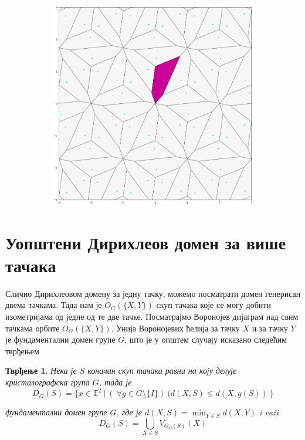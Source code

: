 \documentclass[12pt]{report}
\newtheorem{tvrdjenje}{\bf Тврђење}
\begin{document}
\begin{figure}[H]
\begin{subfigure}[b]{0.32\textwidth}
  \end{subfigure}
  \begin{subfigure}[b]{0.32\textwidth}
    \includegraphics[width=.9\textwidth]{dirihleov3.png}
    \label{fig:f3}
  \end{subfigure}
\end{figure}


    \section{Уопштени Дирихлеов домен за више тачака}\label{konstrukcija-dirihleove-fundamentalne-oblasti}
    
Слично Дирихлеовом домену за једну тачку,  можемо посматрати домен генерисан двема тачкама. Тада нам је  $O_G(\{X,Y\})$ скуп тачака које се могу добити изометријама од једне од те две тачке. Посматрајмо Воронојев дијаграм над свим тачкама орбите $O_G(\{X,Y\})$.  Унија Воронојевих ћелија за тачку $X$ и за тачку $Y$ је фундаментални домен групе $G$, што је у општем случају исказано следећим тврђењем
\begin{tvrdjenje}
Нека је $S$ коначан скуп тачака равни на коју делује кристалографска група $G$, тада је 
$$D_G(S) = \{x \in \mathbb{E}^2\:|\:(\:\forall g \in G \setminus \{I\})\:(d(X,S)\leq d(X,g(S))\:\}$$

фундаментални домен групе $G$, где је $d(X,S) = \min_{Y \in S} d(X,Y)$ i va\v zi 
$$D_G(S) = \bigcup_{X \in S} V_{O_G(S)}(X) $$ 
\end{tvrdjenje}
\end{document}
